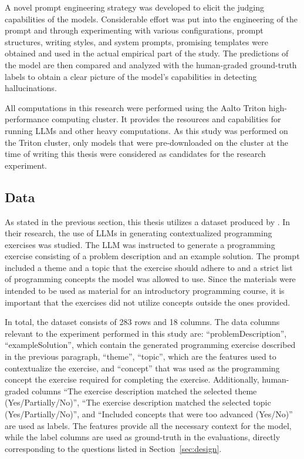 \documentclass[english, 12pt, a4paper, sci, utf8, a-2b, online]{latex/definitions/aaltothesis}
\begin{document}
A novel prompt engineering strategy was developed to elicit the judging capabilities of the models. Considerable effort was put into the engineering of the prompt and through experimenting with various configurations, prompt structures, writing styles, and system prompts, promising templates were obtained and used in the actual empirical part of the study. The predictions of the model are then compared and analyzed with the human-graded ground-truth labels to obtain a clear picture of the model's capabilities in detecting hallucinations.

All computations in this research were performed using the Aalto Triton high-performance computing cluster. It provides the resources and capabilities for running LLMs and other heavy computations. As this study was performed on the Triton cluster, only models that were pre-downloaded on the cluster at the time of writing this thesis were considered as candidates for the research experiment.

\subsection{Data} \label{sec:data}

As stated in the previous section, this thesis utilizes a dataset produced by \textcite{10.1145/3632620.3671103}. In their research, the use of LLMs in generating contextualized programming exercises was studied. The LLM was instructed to generate a programming exercise consisting of a problem description and an example solution. The prompt included a theme and a topic that the exercise should adhere to and a strict list of programming concepts the model was allowed to use. Since the materials were intended to be used as material for an introductory programming course, it is important that the exercises did not utilize concepts outside the ones provided. 

In total, the dataset consists of 283 rows and 18 columns. The data columns relevant to the experiment performed in this study are: ``problemDescription'', ``exampleSolution'', which contain the generated programming exercise described in the previous paragraph, ``theme'', ``topic'', which are the features used to contextualize the exercise, and ``concept'' that was used as the programming concept the exercise required for completing the exercise. Additionally, human-graded columns ``The exercise description matched the selected theme (Yes/Partially/No)'', ``The exercise description matched the selected topic (Yes/Partially/No)'', and ``Included concepts that were too advanced (Yes/No)'' are used as labels. The features provide all the necessary context for the model, while the label columns are used as ground-truth in the evaluations, directly corresponding to the questions listed in Section~\ref{sec:design}.
\end{document}
